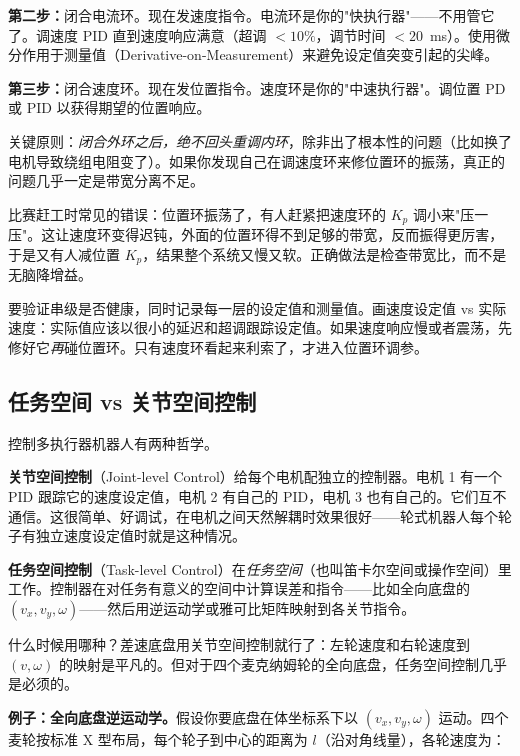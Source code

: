 \textbf{第二步：}闭合电流环。现在发速度指令。电流环是你的"快执行器"——不用管它了。调速度 PID 直到速度响应满意（超调 $<10\%$，调节时间 $<20$~ms）。使用微分作用于测量值（Derivative-on-Measurement）来避免设定值突变引起的尖峰。

\textbf{第三步：}闭合速度环。现在发位置指令。速度环是你的"中速执行器"。调位置 PD 或 PID 以获得期望的位置响应。

关键原则：\textit{闭合外环之后，绝不回头重调内环}，除非出了根本性的问题（比如换了电机导致绕组电阻变了）。如果你发现自己在调速度环来修位置环的振荡，真正的问题几乎一定是带宽分离不足。

比赛赶工时常见的错误：位置环振荡了，有人赶紧把速度环的 $K_p$ 调小来"压一压"。这让速度环变得迟钝，外面的位置环得不到足够的带宽，反而振得更厉害，于是又有人减位置 $K_p$，结果整个系统又慢又软。正确做法是检查带宽比，而不是无脑降增益。

要验证串级是否健康，同时记录每一层的设定值和测量值。画速度设定值 vs 实际速度：实际值应该以很小的延迟和超调跟踪设定值。如果速度响应慢或者震荡，先修好它\textit{再}碰位置环。只有速度环看起来利索了，才进入位置环调参。

\subsection{任务空间 vs 关节空间控制}

控制多执行器机器人有两种哲学。

\textbf{关节空间控制}（Joint-level Control）给每个电机配独立的控制器。电机 1 有一个 PID 跟踪它的速度设定值，电机 2 有自己的 PID，电机 3 也有自己的。它们互不通信。这很简单、好调试，在电机之间天然解耦时效果很好——轮式机器人每个轮子有独立速度设定值时就是这种情况。

\textbf{任务空间控制}（Task-level Control）在\textit{任务空间}（也叫笛卡尔空间或操作空间）里工作。控制器在对任务有意义的空间中计算误差和指令——比如全向底盘的 $(v_x, v_y, \omega)$——然后用逆运动学或雅可比矩阵映射到各关节指令。

什么时候用哪种？差速底盘用关节空间控制就行了：左轮速度和右轮速度到 $(v, \omega)$ 的映射是平凡的。但对于四个麦克纳姆轮的全向底盘，任务空间控制几乎是必须的。

\textbf{例子：全向底盘逆运动学。}假设你要底盘在体坐标系下以 $(v_x, v_y, \omega)$ 运动。四个麦轮按标准 X 型布局，每个轮子到中心的距离为 $l$（沿对角线量），各轮速度为：

